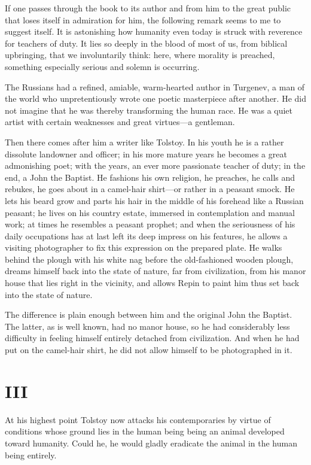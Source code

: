 \documentclass[12pt,a4paper]{article}
\begin{document}
If one passes through the book to its author and from him to the great
public that loses itself in admiration for him, the following remark
seems to me to suggest itself. It is astonishing how humanity even
today is struck with reverence for teachers of duty. It lies so deeply
in the blood of most of us, from biblical upbringing, that we
involuntarily think: here, where morality is preached, something
especially serious and solemn is occurring.

The Russians had a refined, amiable, warm-hearted author in Turgenev,
a man of the world who unpretentiously wrote one poetic masterpiece
after another. He did not imagine that he was thereby transforming the
human race. He was a quiet artist with certain weaknesses and great
virtues---a gentleman.

Then there comes after him a writer like Tolstoy. In his youth he is
a rather dissolute landowner and officer; in his more mature years he
becomes a great admonishing poet; with the years, an ever more
passionate teacher of duty; in the end, a John the Baptist. He
fashions his own religion, he preaches, he calls and rebukes, he goes
about in a camel-hair shirt---or rather in a peasant smock. He lets
his beard grow and parts his hair in the middle of his forehead like
a Russian peasant; he lives on his country estate, immersed in
contemplation and manual work; at times he resembles a peasant
prophet; and when the seriousness of his daily occupations has at
last left its deep impress on his features, he allows a visiting
photographer to fix this expression on the prepared plate. He walks
behind the plough with his white nag before the old-fashioned wooden
plough, dreams himself back into the state of nature, far from
civilization, from his manor house that lies right in the vicinity,
and allows Repin to paint him thus set back into the state of nature.

The difference is plain enough between him and the original John the
Baptist. The latter, as is well known, had no manor house, so he had
considerably less difficulty in feeling himself entirely detached from
civilization. And when he had put on the camel-hair shirt, he did not
allow himself to be photographed in it.

\section*{III}

At his highest point Tolstoy now attacks his contemporaries by virtue
of conditions whose ground lies in the human being being an animal
developed toward humanity. Could he, he would gladly eradicate the
animal in the human being entirely.
\end{document}
